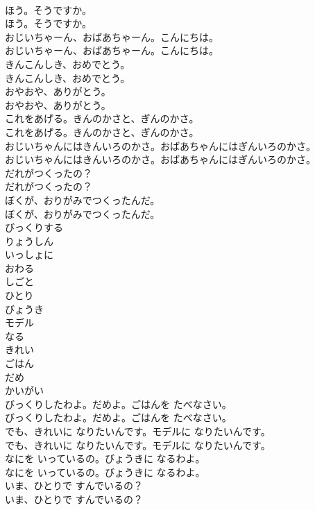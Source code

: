 \documentclass[8pt]{extreport}
\begin{document}
\begin{CJK}{UTF8}{min}
\\	ほう。そうですか。	
\\	ほう。そうですか。 
\\	おじいちゃーん、おばあちゃーん。こんにちは。	
\\	おじいちゃーん、おばあちゃーん。こんにちは。 
\\	きんこんしき、おめでとう。	
\\	きんこんしき、おめでとう。 
\\	おやおや、ありがとう。	
\\	おやおや、ありがとう。 
\\	これをあげる。きんのかさと、ぎんのかさ。	
\\	これをあげる。きんのかさと、ぎんのかさ。 
\\	おじいちゃんにはきんいろのかさ。おばあちゃんにはぎんいろのかさ。	
\\	おじいちゃんにはきんいろのかさ。おばあちゃんにはぎんいろのかさ。 
\\	だれがつくったの？	
\\	だれがつくったの？ 
\\	ぼくが、おりがみでつくったんだ。	
\\	ぼくが、おりがみでつくったんだ。 
\\	びっくりする
\\	りょうしん
\\	いっしょに
\\	おわる
\\	しごと
\\	ひとり
\\	びょうき
\\	モデル
\\	なる
\\	きれい
\\	ごはん
\\	だめ
\\	かいがい
\\	びっくりしたわよ。だめよ。ごはんを たべなさい。	
\\	びっくりしたわよ。だめよ。ごはんを たべなさい。 
\\	でも、きれいに なりたいんです。モデルに なりたいんです。	
\\	でも、きれいに なりたいんです。モデルに なりたいんです。 
\\	なにを いっているの。びょうきに なるわよ。	
\\	なにを いっているの。びょうきに なるわよ。 
\\	いま、ひとりで すんでいるの？	
\\	いま、ひとりで すんでいるの？ 

\end{CJK}
\end{document}
